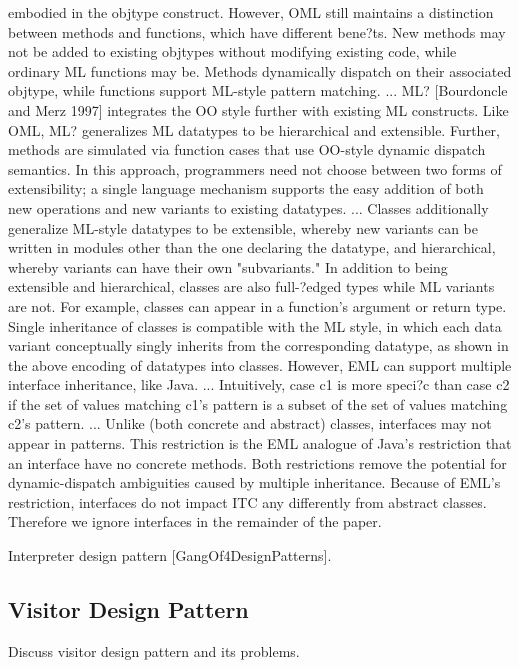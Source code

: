 \documentclass[submission,copyright]{eptcs}
\begin{document}
embodied in the objtype construct. However, OML still maintains a distinction
between methods and functions, which have different bene?ts. New methods
may not be added to existing objtypes without modifying existing code, while
ordinary ML functions may be. Methods dynamically dispatch on their associated objtype, while functions support ML-style pattern matching.
...
ML? [Bourdoncle and Merz 1997] integrates the OO style further with existing ML constructs. Like OML, ML? generalizes ML datatypes to be hierarchical and extensible. Further, methods are simulated via function cases that use
OO-style dynamic dispatch semantics. In this approach, programmers need
not choose between two forms of extensibility; a single language mechanism
supports the easy addition of both new operations and new variants to existing
datatypes.
...
Classes additionally generalize ML-style datatypes to be extensible, whereby
new variants can be written in modules other than the one declaring the
datatype, and hierarchical, whereby variants can have their own "subvariants."
In addition to
being extensible and hierarchical, classes are also full-?edged types while ML
variants are not. For example, classes can appear in a function's argument or
return type.
Single inheritance of classes is compatible with the ML style, in which each 
data variant conceptually singly inherits from the corresponding datatype, as 
shown in the above encoding of datatypes into classes. However, EML can support 
multiple interface inheritance, like Java.
...
Intuitively, case c1
is more speci?c than case c2 if the set of values matching c1's pattern is a
subset of the set of values matching c2's pattern.
...
Unlike (both concrete and abstract) classes, interfaces may not appear in
patterns. This restriction is the EML analogue of Java's restriction that an interface have no concrete methods. Both restrictions remove the potential for
dynamic-dispatch ambiguities caused by multiple inheritance. Because of EML's
restriction, interfaces do not impact ITC any differently from abstract classes.
Therefore we ignore interfaces in the remainder of the paper.

Interpreter design pattern [GangOf4DesignPatterns].

\subsection{Visitor Design Pattern}

Discuss visitor design pattern and its problems.
\end{document}
